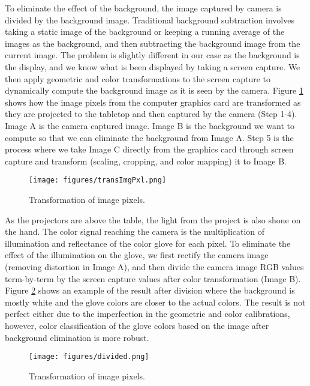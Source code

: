 To eliminate the effect of the background, the image captured by camera is divided by the background image. Traditional background subtraction involves taking a static image of the background or keeping a running average of the images as the background, and then subtracting the background image from the current image. The problem is slightly different in our case as the background is the display, and we know what is been displayed by taking a screen capture. We then apply geometric and color transformations to the screen capture to dynamically compute the background image as it is seen by the camera. Figure \ref{fig:transImgPxl} shows how the image pixels from the computer graphics card are transformed as they are projected to the tabletop and then captured by the camera (Step 1-4). Image A is the camera captured image. Image B is the background we want to compute so that we can eliminate the background from Image A. Step 5 is the process where we take Image C directly from the graphics card through screen capture and transform (scaling, cropping, and color mapping) it to Image B.

\begin{figure}
	\centering
	\texttt{[image: figures/transImgPxl.png]} 
	\caption{Transformation of image pixels.} \label{fig:transImgPxl}
\end{figure}

As the projectors are above the table, the light from the project is also shone on the hand. The color signal reaching the camera is the multiplication of illumination and reflectance of the color glove for each pixel. To eliminate the effect of the illumination on the glove, we first rectify the camera image (removing distortion in Image A), and then divide the camera image RGB values term-by-term by the screen capture values after color transformation (Image B). Figure \ref{fig:divided} shows an example of the result after division where the background is mostly white and the glove colors are closer to the actual colors. The result is not perfect either due to the imperfection in the geometric and color calibrations, however, color classification of the glove colors based on the image after background elimination is more robust.

\begin{figure}
	\centering
	\texttt{[image: figures/divided.png]} 
	\caption{Transformation of image pixels.} \label{fig:divided}
\end{figure}

